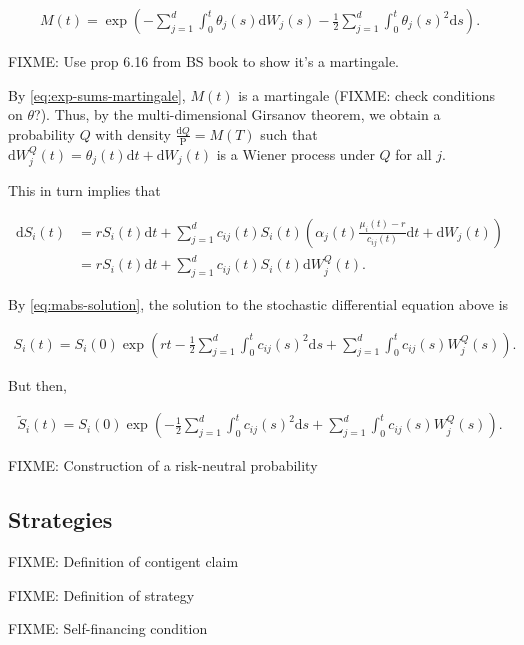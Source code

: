 \documentclass[a4paper]{article}
\begin{document}
\begin{align*}
  M(t) = \exp \left( - \sum_{j=1}^{d} \int_0^t \theta_j(s) \mathrm{d}W_j(s) - \frac{1}{2} \sum_{j=1}^{d} \int_0^t \theta_j(s)^2 \mathrm{d}s \right).
\end{align*}

FIXME: Use prop 6.16 from BS book to show it's a martingale.

By \eqref{eq:exp-sums-martingale}, $M(t)$ is a martingale (FIXME: check conditions on $\theta$?). Thus, by the multi-dimensional Girsanov theorem, we obtain a probability $Q$ with density $\frac{\mathrm{d}Q}{\mathrm{P}} = M(T)$ such that $\mathrm{d}W^Q_j(t) = \theta_j(t) \mathrm{d}t + \mathrm{d}W_j(t)$ is a Wiener process under $Q$ for all $j$.

This in turn implies that

\begin{align*}
  \mathrm{d}S_i(t)
  &= r S_i(t) \mathrm{d}t + \sum_{j=1}^{d} c_{ij}(t) S_i(t) \left(\alpha_j(t) \frac{\mu_i(t) - r}{c_{ij}(t)} \mathrm{d}t + \mathrm{d}W_j(t)\right)\\
  &= r S_i(t) \mathrm{d}t + \sum_{j=1}^{d} c_{ij}(t) S_i(t) \mathrm{d}W^Q_j(t).
\end{align*}

By \eqref{eq:mabs-solution}, the solution to the stochastic differential equation above is

\begin{align*}
  S_i(t)
  = S_i(0) \exp \left( r t - \frac{1}{2} \sum_{j=1}^{d} \int_0^t c_{ij}(s)^2 \mathrm{d}s + \sum_{j=1}^{d} \int_0^t c_{ij}(s) W^Q_j(s) \right).
\end{align*}

But then,

\begin{align*}
  \tilde{S}_i(t)
  = S_i(0) \exp \left( - \frac{1}{2} \sum_{j=1}^{d} \int_0^t c_{ij}(s)^2 \mathrm{d}s + \sum_{j=1}^{d} \int_0^t c_{ij}(s) W^Q_j(s) \right).
\end{align*}

FIXME: Construction of a risk-neutral probability

\subsection{Strategies}

FIXME: Definition of contigent claim

FIXME: Definition of strategy

FIXME: Self-financing condition
\end{document}
